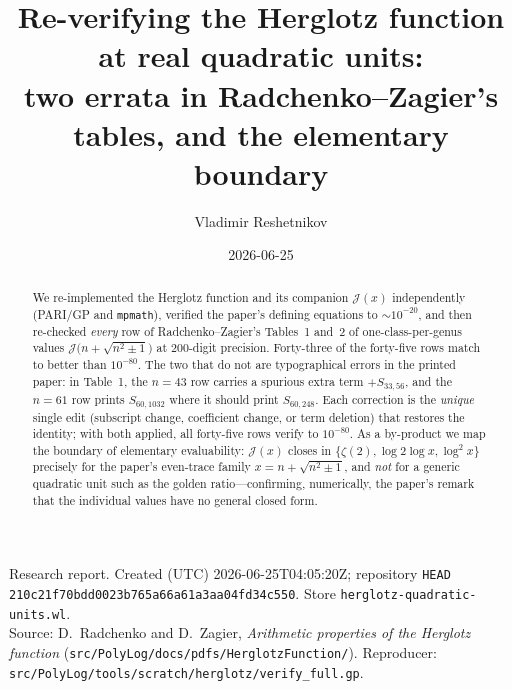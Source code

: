\documentclass[11pt]{article}
\title{Re-verifying the Herglotz function at real quadratic units:\\
two errata in Radchenko--Zagier's tables, and the elementary boundary}
\author{Vladimir Reshetnikov}
\date{2026-06-25}
\newcommand{\Jcal}{\mathcal{J}}
\theoremstyle{plain}\newtheorem{theorem}{Theorem}\newtheorem{proposition}[theorem]{Proposition}
\theoremstyle{remark}\newtheorem{remark}[theorem]{Remark}
\begin{document}
\maketitle
\begin{center}\small
Research report. Created (UTC) 2026-06-25T04:05:20Z; repository \texttt{HEAD}
\texttt{210c21f70bdd0023b765a66a61a3aa04fd34c550}. Store \texttt{herglotz-quadratic-units.wl}.\\
Source: D.\ Radchenko and D.\ Zagier, \emph{Arithmetic properties of the Herglotz function}
(\texttt{src/PolyLog/docs/pdfs/HerglotzFunction/}). Reproducer:
\texttt{src/PolyLog/tools/scratch/herglotz/verify\_full.gp}.
\end{center}

\begin{abstract}
We re-implemented the Herglotz function and its companion $\Jcal(x)$ independently (PARI/GP and
\texttt{mpmath}), verified the paper's defining equations to $\sim10^{-20}$, and then re-checked
\emph{every} row of Radchenko--Zagier's Tables~1 and~2 of one-class-per-genus values
$\Jcal\bigl(n+\sqrt{n^2\pm1}\bigr)$ at $200$-digit precision. Forty-three of the forty-five rows match to
better than $10^{-80}$. The two that do not are typographical errors in the printed paper: in Table~1,
the $n=43$ row carries a spurious extra term $+S_{33,56}$, and the $n=61$ row prints $S_{60,1032}$ where
it should print $S_{60,248}$. Each correction is the \emph{unique} single edit (subscript change,
coefficient change, or term deletion) that restores the identity; with both applied, all forty-five rows
verify to $10^{-80}$. As a by-product we map the boundary of elementary evaluability: $\Jcal(x)$ closes in
$\{\zeta(2),\log2\log x,\log^2x\}$ precisely for the paper's even-trace family $x=n+\sqrt{n^2\pm1}$, and
\emph{not} for a generic quadratic unit such as the golden ratio---confirming, numerically, the paper's
remark that the individual values have no general closed form.
\end{abstract}
\end{document}
